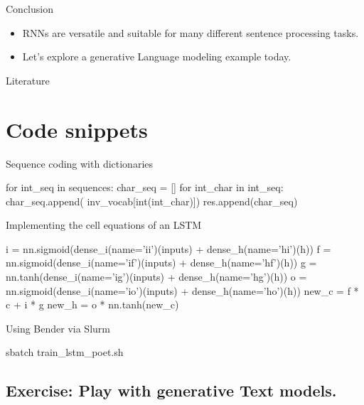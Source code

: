 \documentclass{beamer}
\begin{document}
    \begin{frame}{Conclusion}
      \begin{itemize}
        \item RNNs are versatile and suitable for many different sentence processing tasks.
        \item Let's explore a generative Language modeling example today.
      \end{itemize}
    \end{frame}

    \begin{frame}[allowframebreaks]{Literature}
      \printbibliography
    \end{frame}

    \section{Code snippets}
    \begin{frame}[fragile]{Sequence coding with dictionaries}
    \begin{python}
      for int_seq in sequences:
      char_seq = []
      for int_char in int_seq:
          char_seq.append(
            inv_vocab[int(int_char)])
      res.append(char_seq)
    \end{python}
    \end{frame}

    \begin{frame}[fragile]{Implementing the cell equations of an LSTM}
\begin{python}
i = nn.sigmoid(dense_i(name='ii')(inputs)
  + dense_h(name='hi')(h))
f = nn.sigmoid(dense_i(name='if')(inputs)
  + dense_h(name='hf')(h))
g = nn.tanh(dense_i(name='ig')(inputs)
  + dense_h(name='hg')(h))
o = nn.sigmoid(dense_i(name='io')(inputs)
  + dense_h(name='ho')(h))
new_c = f * c + i * g
new_h = o *  nn.tanh(new_c)
\end{python}
    \end{frame}

    \begin{frame}[fragile]{Using Bender via Slurm}
      \begin{python}
      sbatch train_lstm_poet.sh
      \end{python}
    \end{frame}


    \subsection{Exercise: Play with generative Text models.}
\end{document}
